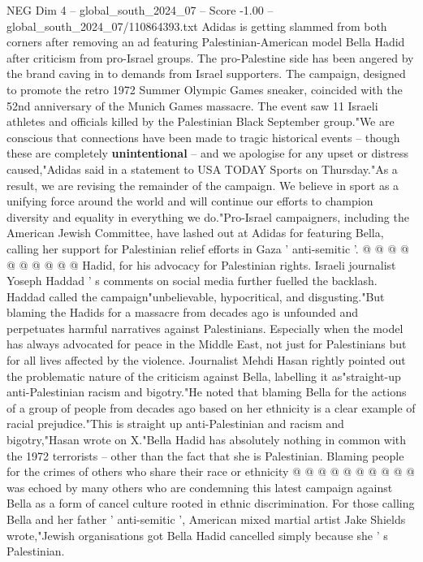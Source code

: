 \begin{textsample}{NEG Dim 4 – global\_south\_2024\_07 – Score -1.00 – global\_south\_2024\_07/110864393.txt}  \label{ex:f4_neg_341}
Adidas is getting slammed from both corners after removing an ad featuring Palestinian-American model Bella Hadid after criticism from pro-Israel groups.
The pro-Palestine side has been angered by the brand caving in to demands from Israel supporters.
The campaign, designed to promote the retro 1972 Summer Olympic Games sneaker, coincided with the 52nd anniversary of the Munich Games massacre.
The event saw 11 Israeli athletes and officials killed by the Palestinian Black September group."We are conscious that connections have been made to tragic historical events -- though these are completely \textbf{unintentional} -- and we apologise for any upset or distress caused,"Adidas said in a statement to USA TODAY Sports on Thursday."As a result, we are revising the remainder of the campaign.
We believe in sport as a unifying force around the world and will continue our efforts to champion diversity and equality in everything we do."Pro-Israel campaigners, including the American Jewish Committee, have lashed out at Adidas for featuring Bella, calling her support for Palestinian relief efforts in Gaza ' anti-semitic '. @ @ @ @ @ @ @ @ @ @ Hadid, for his advocacy for Palestinian rights.
Israeli journalist Yoseph Haddad ' s comments on social media further fuelled the backlash.
Haddad called the campaign"unbelievable, hypocritical, and disgusting."But blaming the Hadids for a massacre from decades ago is unfounded and perpetuates harmful narratives against Palestinians.
Especially when the model has always advocated for peace in the Middle East, not just for Palestinians but for all lives affected by the violence.
Journalist Mehdi Hasan rightly pointed out the problematic nature of the criticism against Bella, labelling it as"straight-up anti-Palestinian racism and bigotry."He noted that blaming Bella for the actions of a group of people from decades ago based on her ethnicity is a clear example of racial prejudice."This is straight up anti-Palestinian and racism and bigotry,"Hasan wrote on X."Bella Hadid has absolutely nothing in common with the 1972 terrorists -- other than the fact that she is Palestinian.
Blaming people for the crimes of others who share their race or ethnicity @ @ @ @ @ @ @ @ @ @ was echoed by many others who are condemning this latest campaign against Bella as a form of cancel culture rooted in ethnic discrimination.
For those calling Bella and her father ' anti-semitic ', American mixed martial artist Jake Shields wrote,"Jewish organisations got Bella Hadid cancelled simply because she ' s Palestinian.

\end{textsample}
